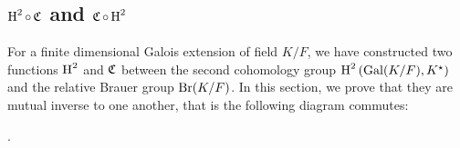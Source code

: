 \subsection{$\operatorname{H}^{2} \circ \operatorname{\mathfrak{C}}$ and $\operatorname{\mathfrak{C}} \circ \operatorname{H}^{2}$}

For a finite dimensional Galois extension of field $K/F$, we have constructed two functions $\operatorname{H}^{2}$ and $\operatorname{\mathfrak{C}}$ between the second cohomology group $\operatorname{H}^{2}\left(\operatorname{Gal}(K/F), K^{\star}\right)$ and the relative Brauer group $\operatorname{Br}(K/F)$. In this section, we prove that they are mutual inverse to one another, that is the following diagram commutes:
\begin{center}
  .
\end{center}

\begin{lemma}
  \leanok
\end{lemma}

